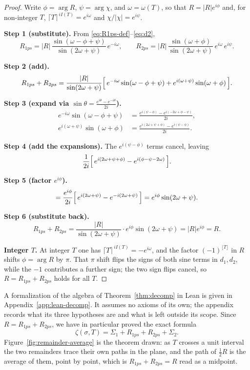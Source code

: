 \documentclass[11pt]{article}
\theoremstyle{definition}
\begin{document}
\begin{proof}
Write $\phi = \arg R$, $\psi = \arg\chi$, and $\omega=\omega(T)$, so that
$R=|R|e^{i\phi}$ and, for non-integer $T$, $\lceil T\rceil^{\,iI(T)}=e^{i\omega}$
and $\chi/|\chi|=e^{i\psi}$.

\smallskip
\noindent\textbf{Step 1 (substitute).} From \eqref{eq:R1ps-def}--\eqref{eq:d2},
\[
R_{1ps} = |R|\,\frac{\sin(\omega - \phi + \psi)}{\sin(2\omega + \psi)}\, e^{-i\omega},
\qquad
R_{2ps} = |R|\,\frac{\sin(\omega + \phi)}{\sin(2\omega + \psi)}\, e^{i\omega}\, e^{i\psi}.
\]

\noindent\textbf{Step 2 (add).}
\[
R_{1ps} + R_{2ps}
= \frac{|R|}{\sin(2\omega + \psi)}
\Bigl[\, e^{-i\omega}\sin(\omega - \phi + \psi) + e^{i(\omega + \psi)}\sin(\omega + \phi)\,\Bigr].
\]

\noindent\textbf{Step 3 (expand via $\sin\theta = \tfrac{e^{i\theta}-e^{-i\theta}}{2i}$).}
\begin{align*}
e^{-i\omega}\sin(\omega - \phi + \psi)
&= \frac{e^{i(\psi - \phi)} - e^{i(-2\omega + \phi - \psi)}}{2i}, \\
e^{i(\omega + \psi)}\sin(\omega + \phi)
&= \frac{e^{i(2\omega + \psi + \phi)} - e^{i(\psi - \phi)}}{2i}.
\end{align*}

\noindent\textbf{Step 4 (add the expansions).} The $e^{i(\psi-\phi)}$ terms
cancel, leaving
\[
\frac{1}{2i}\Bigl[\, e^{i(2\omega + \psi + \phi)} - e^{i(\phi - \psi - 2\omega)}\,\Bigr].
\]

\noindent\textbf{Step 5 (factor $e^{i\phi}$).}
\[
= \frac{e^{i\phi}}{2i}\Bigl[\, e^{i(2\omega + \psi)} - e^{-i(2\omega + \psi)}\,\Bigr]
= e^{i\phi}\sin(2\omega + \psi).
\]

\noindent\textbf{Step 6 (substitute back).}
\[
R_{1ps} + R_{2ps}
= \frac{|R|}{\sin(2\omega + \psi)}\cdot e^{i\phi}\sin(2\omega + \psi)
= |R|e^{i\phi} = R.
\]

\smallskip
\noindent\textbf{Integer $T$.} At integer $T$ one has
$\lceil T\rceil^{\,iI(T)} = -e^{i\omega}$, and the factor $(-1)^{\lfloor T\rfloor}$
in $R$ shifts $\phi=\arg R$ by $\pi$. That $\pi$ shift flips the signs of both
sine terms in $d_1,d_2$, while the $-1$ contributes a further sign; the two sign
flips cancel, so $R = R_{1ps}+R_{2ps}$ holds for all $T$.
\end{proof}

A formalization of the algebra of Theorem~\ref{thm:decomp} in Lean is given in
Appendix~\ref{app:lean-decomp}. It assumes no axioms of its own; the appendix
records what its three hypotheses are and what is left outside its scope.
Since $R=R_{1ps}+R_{2ps}$, we have in particular proved the exact formula
\begin{equation}\label{eq:zeta-ps}
\zeta(\sigma,T)
=
\Sigma_{1} + R_{1ps} + R_{2ps} + \Sigma_{2}.
\end{equation}
Figure~\ref{fig:remainder-average} is the theorem drawn: as $T$ crosses a unit
interval the two remainders trace their own paths in the plane, and the path of
$\tfrac12R$ is the average of them, point by point, which is
$R_{1ps}+R_{2ps}=R$ read as a midpoint.
\end{document}
